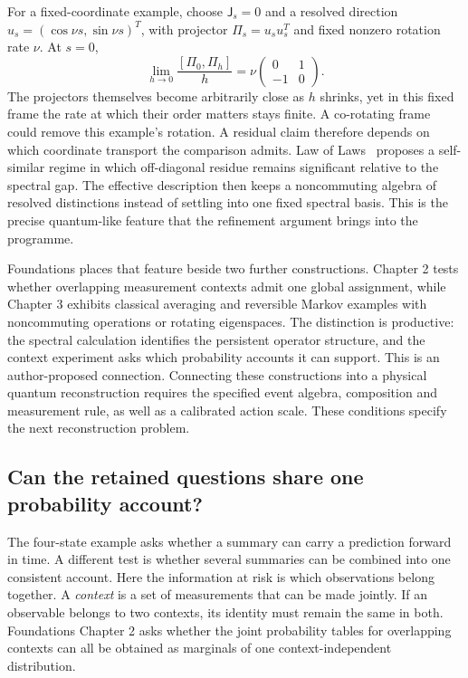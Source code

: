 For a fixed-coordinate example, choose $\mathsf J_s=0$ and a resolved direction $u_s=(\cos\nu s,\sin\nu s)^T$, with projector $\Pi_s=u_su_s^T$ and fixed nonzero rotation rate $\nu$. At $s=0$,
\[
 \lim_{h\to0}\frac{[\Pi_0,\Pi_h]}h
 =\nu\begin{pmatrix}0&1\\-1&0\end{pmatrix}.
\]
The projectors themselves become arbitrarily close as $h$ shrinks, yet in this fixed frame the rate at which their order matters stays finite. A co-rotating frame could remove this example's rotation. A residual claim therefore depends on which coordinate transport the comparison admits. Law of Laws~\cite{McCaulad9572} proposes a self-similar regime in which off-diagonal residue remains significant relative to the spectral gap. The effective description then keeps a noncommuting algebra of resolved distinctions instead of settling into one fixed spectral basis. This is the precise quantum-like feature that the refinement argument brings into the programme.

Foundations places that feature beside two further constructions. Chapter 2 tests whether overlapping measurement contexts admit one global assignment, while Chapter 3 exhibits classical averaging and reversible Markov examples with noncommuting operations or rotating eigenspaces. The distinction is productive: the spectral calculation identifies the persistent operator structure, and the context experiment asks which probability accounts it can support. This is an author-proposed connection. Connecting these constructions into a physical quantum reconstruction requires the specified event algebra, composition and measurement rule, as well as a calibrated action scale. These conditions specify the next reconstruction problem.

\subsection{Can the retained questions share one probability account?}
The four-state example asks whether a summary can carry a prediction forward in time. A different test is whether several summaries can be combined into one consistent account. Here the information at risk is which observations belong together. A \emph{context} is a set of measurements that can be made jointly. If an observable belongs to two contexts, its identity must remain the same in both. Foundations Chapter 2 asks whether the joint probability tables for overlapping contexts can all be obtained as marginals of one context-independent distribution.~\cite{McCaul85986c}

